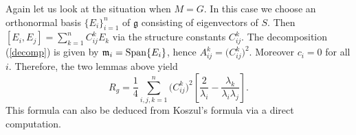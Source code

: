 \documentclass[10pt,a4paper]{amsart}
\begin{document}
\begin{Remark} \label{rflg}	Again let us look at the situation when $M=G$. In this case we choose an orthonormal basis $\{E_{i}\}_{i=1}^{n}$ of $\mathfrak{g}$ consisting of eigenvectors of $S$. Then $[E_{i},E_{j}]=\sum\limits_{k=1}^n C_{ij}^{k}E_k$ via the structure constants $C_{ij}^{k}$. The decomposition (\ref{decomp}) is given by $\mathfrak{m}_i={\rm Span}\{ E_i \}$, hence $A_{ij}^{k}=\big(C^k_{ij}\big)^2$. Moreover $c_i=0$ for all $i$. Therefore, the two lemmas above yield
\begin{equation} \label{ffsclg}
R_g= \frac{1}{4} \sum_{i, j, k=1}^n \big(C^k_{ij}\big)^2
\left[ \frac{2}{\lambda_i}- \frac{\lambda_{k}}{\lambda_i\lambda_{j}} \right].
\end{equation}
This formula can also be deduced from Koszul's formula via a direct computation.
\end{Remark}
\end{document}

